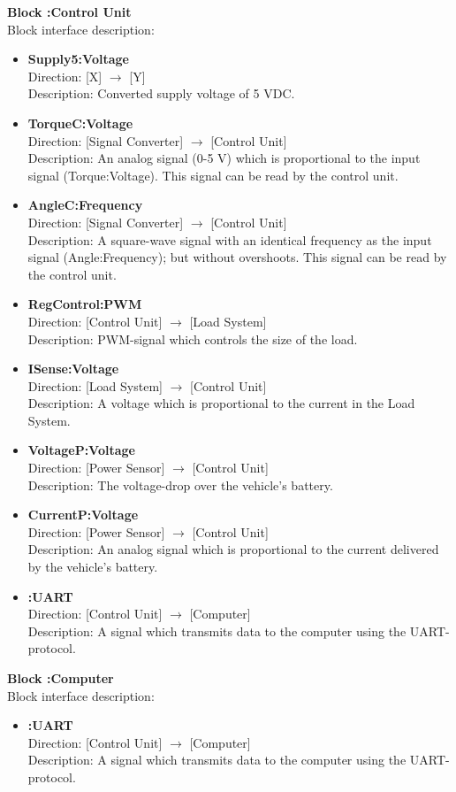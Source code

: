 \textbf{Block :Control Unit}\\
Block interface description:
\begin{itemize}
	\item \textbf{Supply5:Voltage}\\
	Direction: [X] $\rightarrow$ [Y]\\
	Description: Converted supply voltage of 5 VDC.
	\item \textbf{TorqueC:Voltage}\\
	Direction: [Signal Converter] $\rightarrow$ [Control Unit]\\
	Description: An analog signal (0-5 V) which is proportional to the input signal (Torque:Voltage). This signal can be read by the control unit.
	\item \textbf{AngleC:Frequency}\\
	Direction: [Signal Converter] $\rightarrow$ [Control Unit]\\
	Description: A square-wave signal with an identical frequency as the input signal (Angle:Frequency); but without overshoots. This signal can be read by the control unit.
	\item \textbf{RegControl:PWM}\\
	Direction: [Control Unit] $\rightarrow$ [Load System]\\
	Description: PWM-signal which controls the size of the load.
	\item \textbf{ISense:Voltage}\\
	Direction: [Load System] $\rightarrow$ [Control Unit]\\
	Description: A voltage which is proportional to the current in the Load System.
	\item \textbf{VoltageP:Voltage}\\
	Direction: [Power Sensor] $\rightarrow$ [Control Unit]\\
	Description: The voltage-drop over the vehicle's battery.
	\item \textbf{CurrentP:Voltage}\\
	Direction: [Power Sensor] $\rightarrow$ [Control Unit]\\
	Description: An analog signal which is proportional to the current delivered by the vehicle's battery.
	\item \textbf{:UART}\\
	Direction: [Control Unit] $\rightarrow$ [Computer]\\
	Description: A signal which transmits data to the computer using the UART-protocol.
\end{itemize}

\textbf{Block :Computer}\\
Block interface description:
\begin{itemize}
	\item \textbf{:UART}\\
	Direction: [Control Unit] $\rightarrow$ [Computer]\\
	Description: A signal which transmits data to the computer using the UART-protocol.
\end{itemize}